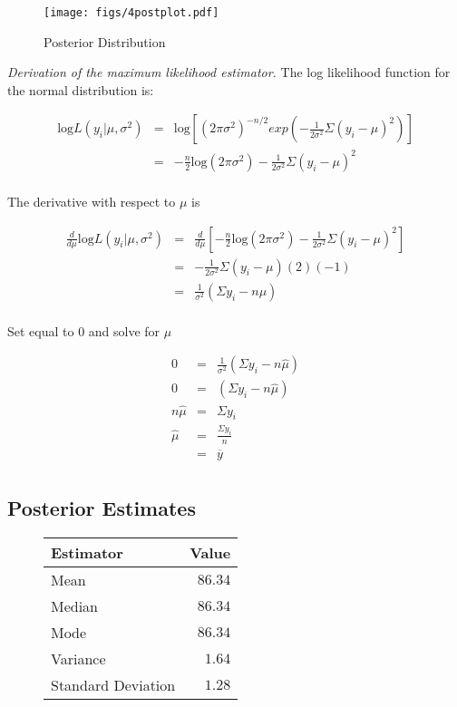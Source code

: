 \documentclass[12pt]{article}
\newcommand{\ybar}{\overline{y}}
\begin{document}
\begin{figure}[H]
\begin{center}
\texttt{[image: figs/4postplot.pdf]}
\caption{Posterior Distribution}
\end{center}
\end{figure}

\noindent \textit{Derivation of the maximum likelihood estimator.}  The log likelihood function for the normal distribution is:

\begin{eqnarray*}
\mathrm{log}L(y_i|\mu,\sigma^2) &=& \mathrm{log}\left[(2\pi\sigma^2)^{-n/2}exp\left(-\frac{1}{2\sigma^2}\Sigma(y_i-\mu)^2\right)\right] \\
&=& -\frac{n}{2}\mathrm{log}(2\pi\sigma^2)-\frac{1}{2\sigma^2}\Sigma(y_i-\mu)^2 \\
\end{eqnarray*}

The derivative with respect to $\mu$ is

\begin{eqnarray*}
\frac{d}{d\mu}\mathrm{log}L(y_i|\mu,\sigma^2) &=& \frac{d}{d\mu}\left[-\frac{n}{2}\mathrm{log}(2\pi\sigma^2)-\frac{1}{2\sigma^2}\Sigma(y_i-\mu)^2\right] \\
&=& -\frac{1}{2\sigma^2}\Sigma(y_i-\mu)(2)(-1) \\
&=& \frac{1}{\sigma^2}(\Sigma y_i-n\mu) \\
\end{eqnarray*}

Set equal to 0 and solve for $\hat{\mu}$

\begin{eqnarray*}
0 &=& \frac{1}{\sigma^2}(\Sigma y_i-n\hat{\mu}) \\
0 &=& (\Sigma y_i-n\hat{\mu}) \\
n\hat{\mu} &=& \Sigma y_i \\
\hat{\mu} &=& \frac{\Sigma y_i}{n} \\
&=& \ybar \\
\end{eqnarray*}

\subsection{Posterior Estimates}

\begin{figure}[H]
\begin{center}
\begin{tabular}{l|r}
Estimator & \multicolumn{1}{l}{Value} \\ \hline \hline
Mean               & $86.34$ \\
Median             & $86.34$ \\
Mode               & $86.34$ \\
Variance           & $1.64$ \\
Standard Deviation & $1.28$ \\
\end{tabular}
\end{center}
\end{figure}
\end{document}
